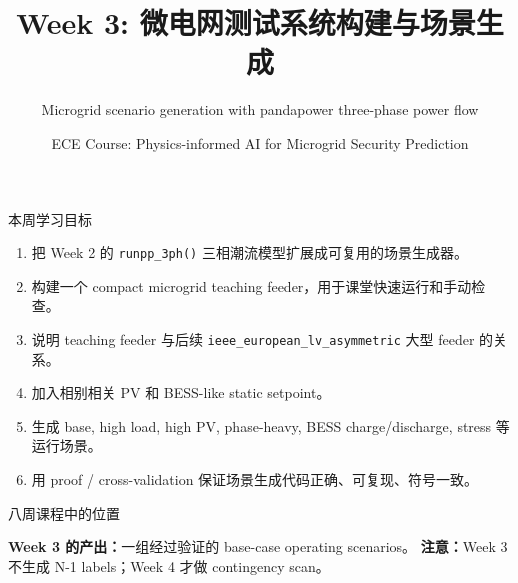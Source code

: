 \documentclass[aspectratio=169,11pt]{beamer}
\title[Week 3]{Week 3: 微电网测试系统构建与场景生成}
\subtitle{Microgrid scenario generation with pandapower three-phase power flow}
\author{ECE Course: Physics-informed AI for Microgrid Security Prediction}
\date{}
\begin{document}
\begin{frame}
  \titlepage
\end{frame}

\begin{frame}{本周学习目标}
\begin{enumerate}
  \item 把 Week 2 的 \texttt{runpp\_3ph()} 三相潮流模型扩展成可复用的场景生成器。
  \item 构建一个 compact microgrid teaching feeder，用于课堂快速运行和手动检查。
  \item 说明 teaching feeder 与后续 \texttt{ieee\_european\_lv\_asymmetric} 大型 feeder 的关系。
  \item 加入相别相关 PV 和 BESS-like static setpoint。
  \item 生成 base, high load, high PV, phase-heavy, BESS charge/discharge, stress 等运行场景。
  \item 用 proof / cross-validation 保证场景生成代码正确、可复现、符号一致。
\end{enumerate}
\end{frame}

\begin{frame}{八周课程中的位置}
\centering
{}
\vspace{0.5cm}

\textbf{Week 3 的产出：}一组经过验证的 base-case operating scenarios。\newline
\textbf{注意：}Week 3 不生成 N-1 labels；Week 4 才做 contingency scan。
\end{frame}
\end{document}
